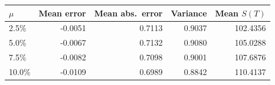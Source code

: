 \begin{tabular}{lrrrr}
\toprule
$\mu$ & Mean error & Mean abs.\ error & Variance & Mean $S(T)$ \\
\midrule
2.5\% & -0.0051 & 0.7113 & 0.9037 & 102.4356 \\
5.0\% & -0.0067 & 0.7132 & 0.9080 & 105.0288 \\
7.5\% & -0.0082 & 0.7098 & 0.9001 & 107.6876 \\
10.0\% & -0.0109 & 0.6989 & 0.8842 & 110.4137 \\
\bottomrule
\end{tabular}
